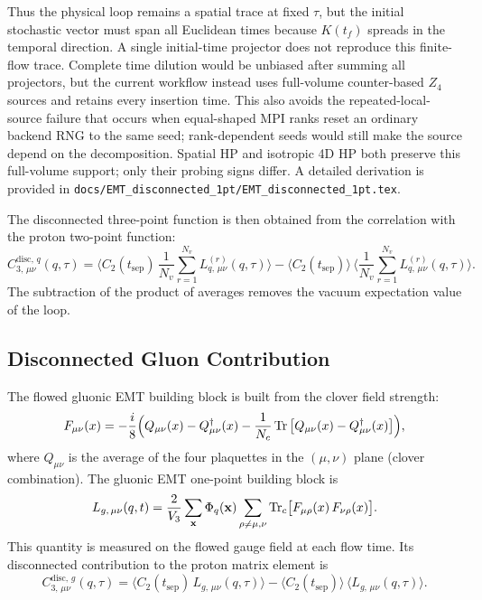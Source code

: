 \documentclass[11pt,a4paper]{article}
\newcommand{\momtrans}{q}
\newcommand{\code}[1]{\texttt{#1}}
\begin{document}
Thus the physical loop remains a spatial trace at fixed \(\tau\), but the
initial stochastic vector must span all Euclidean times because \(K(t_f)\)
spreads in the temporal direction.  A single initial-time projector does not
reproduce this finite-flow trace.  Complete time dilution would be unbiased
after summing all projectors, but the current workflow instead uses
full-volume counter-based \(Z_4\) sources and retains every insertion time.
This also avoids the repeated-local-source failure that occurs when equal-shaped
MPI ranks reset an ordinary backend RNG to the same seed; rank-dependent seeds
would still make the source depend on the decomposition.
Spatial HP and isotropic 4D HP both preserve this full-volume support; only
their probing signs differ.  A detailed derivation is provided in
\code{docs/EMT\_disconnected\_1pt/EMT\_disconnected\_1pt.tex}.

The disconnected three-point function is then obtained from the correlation with
the proton two-point function:
\begin{equation}
  C_{3,\,\mu\nu}^{\text{disc},\,q}(\momtrans,\tau)
  = \Big\langle C_{2}(t_{\text{sep}})\,
           \frac{1}{N_{v}}\sum_{r=1}^{N_{v}} L_{q,\,\mu\nu}^{(r)}(\momtrans,\tau)
    \Big\rangle
    - \big\langle C_{2}(t_{\text{sep}})\big\rangle\,
      \Big\langle \frac{1}{N_{v}}\sum_{r=1}^{N_{v}} L_{q,\,\mu\nu}^{(r)}(\momtrans,\tau)
      \Big\rangle.
\end{equation}
The subtraction of the product of averages removes the vacuum expectation value
of the loop.

\subsection{Disconnected Gluon Contribution}

The flowed gluonic EMT building block is built from the clover field strength:
\begin{equation}
  F_{\mu\nu}(x) = -\frac{i}{8}\Big(
    Q_{\mu\nu}(x) - Q_{\mu\nu}^{\dagger}(x)
    - \frac{1}{N_{c}}\Tr\big[Q_{\mu\nu}(x) - Q_{\mu\nu}^{\dagger}(x)\big]
  \Big),
\end{equation}
where $Q_{\mu\nu}$ is the average of the four plaquettes in the $(\mu,\nu)$ plane
(clover combination).  The gluonic EMT one-point building block is
\begin{equation}
  L_{g,\,\mu\nu}(\momtrans,t)
  = \frac{2}{V_{3}}\sum_{\mathbf{x}}
    \Phi_{\momtrans}(\mathbf{x})
    \sum_{\rho\neq\mu,\nu}
    \Tr_{c}\!\big[F_{\mu\rho}(x)\,F_{\nu\rho}(x)\big].
\end{equation}
This quantity is measured on the flowed gauge field at each flow time.  Its
disconnected contribution to the proton matrix element is
\begin{equation}
  C_{3,\,\mu\nu}^{\text{disc},\,g}(\momtrans,\tau)
  = \Big\langle C_{2}(t_{\text{sep}})\,
           L_{g,\,\mu\nu}(\momtrans,\tau)
    \Big\rangle
    - \big\langle C_{2}(t_{\text{sep}})\big\rangle\,
      \big\langle L_{g,\,\mu\nu}(\momtrans,\tau)\big\rangle.
\end{equation}
\end{document}

